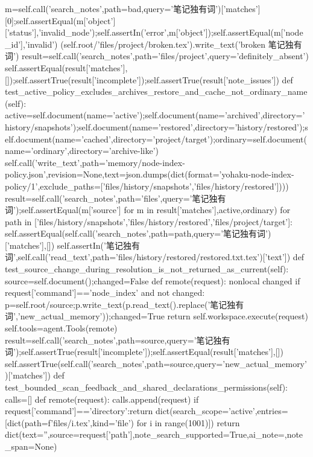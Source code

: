         m=self.call('search_notes',path=bad,query='笔记独有词')['matches'][0];self.assertEqual(m['object']['status'],'invalid_node');self.assertIn('error',m['object']);self.assertEqual(m['node_id'],'invalid')
        (self.root/'files/project/broken.tex').write_text('broken 笔记独有词')
        result=self.call('search_notes',path='files/project',query='definitely_absent')
        self.assertEqual(result['matches'],[]);self.assertTrue(result['incomplete']);self.assertTrue(result['note_issues'])
    def test_active_policy_excludes_archives_restore_and_cache_not_ordinary_name(self):
        active=self.document(name='active');self.document(name='archived',directory='history/snapshots');self.document(name='restored',directory='history/restored');self.document(name='cached',directory='project/target');ordinary=self.document(name='ordinary',directory='archive-like')
        self.call('write_text',path='memory/node-index-policy.json',revision=None,text=json.dumps(dict(format='yohaku-node-index-policy/1',exclude_paths=['files/history/snapshots','files/history/restored'])))
        result=self.call('search_notes',path='files',query='笔记独有词');self.assertEqual({m['source'] for m in result['matches']},{active,ordinary})
        for path in ['files/history/snapshots','files/history/restored','files/project/target']:
            self.assertEqual(self.call('search_notes',path=path,query='笔记独有词')['matches'],[])
        self.assertIn('笔记独有词',self.call('read_text',path='files/history/restored/restored.txt.tex')['text'])
    def test_source_change_during_resolution_is_not_returned_as_current(self):
        source=self.document();changed=False
        def remote(request):
            nonlocal changed
            if request['command']=='node_index' and not changed:
                p=self.root/source;p.write_text(p.read_text().replace('笔记独有词','new_actual_memory'));changed=True
            return self.workspace.execute(request)
        self.tools=agent.Tools(remote)
        result=self.call('search_notes',path=source,query='笔记独有词');self.assertTrue(result['incomplete']);self.assertEqual(result['matches'],[])
        self.assertTrue(self.call('search_notes',path=source,query='new_actual_memory')['matches'])
    def test_bounded_scan_feedback_and_shared_declarations_permissions(self):
        calls=[]
        def remote(request):
            calls.append(request)
            if request['command']=='directory':return dict(search_scope='active',entries=[dict(path=f'files/{i}.tex',kind='file') for i in range(1001)])
            return dict(text='',source=request['path'],note_search_supported=True,ai_note={},note_span=None)
